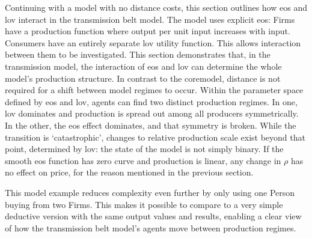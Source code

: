 


Continuing with a model with no distance costs, this section outlines how \gls{eos} and \gls{lov} interact in the transmission belt model. The model uses explicit \gls{eos}: Firms have a production function where output per unit input increases with input. Consumers have an entirely separate \gls{lov} utility function. This allows interaction between them to be investigated. This section demonstrates that, in the transmission model, the interaction of \gls{eos} and \gls{lov} can determine the whole model's production structure. In contrast to the \gls{coremodel}, distance is not required for a shift between model regimes to occur. Within the parameter space defined by \gls{eos} and \gls{lov}, agents can find two distinct production regimes. In one, \gls{lov} dominates and production is spread out among all  producers symmetrically. In the other, the \gls{eos} effect dominates, and that symmetry is broken. While the transition is `catastrophic', changes to relative production scale exist beyond that point, determined by \gls{lov}: the state of the model is not simply binary. If the smooth \gls{eos} function has zero curve and production is linear, any change in $\rho$ has no effect on price, for the reason mentioned in the previous section. 

This model example reduces complexity even further by only using one Person buying from two Firms. This makes it possible to compare to a very simple deductive version with the same output values and results, enabling a clear view of how the transmission belt model's agents move between production regimes. 

